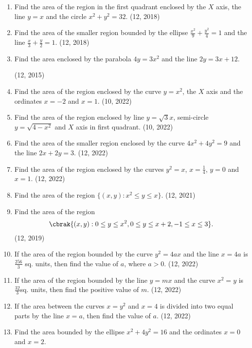 \begin{enumerate}[label=\thesubsection.\arabic*,ref=\thesubsection.\theenumi]
\item Find the area of the region in the first quadrant enclosed by the $X$ axis, the line $y=x$ and the circle $x^{2}+y^{2}=32$. \hfill (12, 2018)
\item Find the area of the smaller region bounded by the ellipse $\frac{x^{2}}{9}+\frac{y^{2}}{4}=1$ and the line $\frac{x}{3}+\frac{y}{2}=1$. \hfill (12, 2018)
\item Find the area enclosed by the parabola $4y = 3x^2$ and the line $2y = 3x+12$. 

\hfill (12, 2015)
\item Find the area of the region enclosed by the curve $ y=x^2 $, the $X$ axis and the ordinates $x=-2$  and  $x=1$.
\hfill (10, 2022)
\item Find the area of the region enclosed by line $y=\sqrt{3}x$,  semi-circle $y=\sqrt{4-x^2}$ and $X$ axis in first quadrant.
\hfill (10, 2022)
\item Find the area of the smaller region enclosed by the curve ${4x^2 + 4y^2} = 9$ and the line $2x + 2y =3$.
\hfill (12, 2022)
\item Find the area of the region enclosed by the curves $y^2=x$, $x=\frac{1}{4}$,  $y=0$ and $x=1$.
\hfill (12, 2022)
\item Find the area of the region $\{(x,y) : x^2 \leq y \leq x\}$.
\hfill (12, 2021)
\item Find the area of the region 
\begin{align*}
    \cbrak{(x,y):0\leq y \leq x^{2},0 \leq y \leq x +2 , -1 \leq x \leq 3}.
\end{align*}
\hfill (12, 2019)

\item If the area of the region bounded by the curve $y^2 = 4ax$ and the line $x = 4a$ is $\frac{256}{3}$ sq. units, then find the value of $a$, where $a>0$.
\hfill (12, 2022)

\item If the area of the region bounded by the line $y=mx$ and the curve $x^2=y$ is $\frac{32}{3}$sq. units, then find the positive value of $m$.
\hfill (12, 2022)

\item If the area between the curves $x = y^2$ and $x = 4$ is divided into two equal parts by the line $x = a$, then find the value of $a$.
\hfill (12, 2022)

\item Find the area bounded by the ellipse $x^2+4y^2=16$ and the ordinates $x=0$ and $x=2$.


\end{enumerate}
